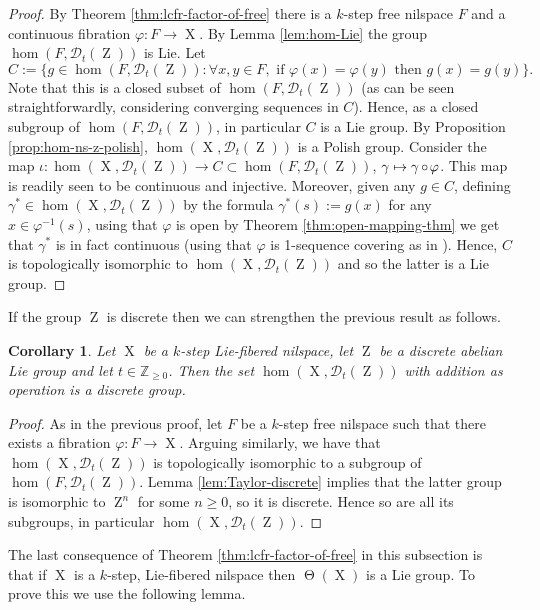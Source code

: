 \documentclass[a4paper,12pt,reqno]{amsart}
\newtheorem{corollary}[theorem]{Corollary}
\theoremstyle{definition}
\def\to{\rightarrow}
\newcommand{\mc}{\mathcal}
\newcommand{\mb}{\mathbb}
\DeclareMathOperator{\ab}{Z}
\DeclareMathOperator{\tran}{\Theta}
\DeclareMathOperator{\ns}{X}
\DeclareMathOperator{\co}{\circ\hspace{-0.02 cm}}
\begin{document}
\begin{proof}
By Theorem \ref{thm:lcfr-factor-of-free} there is a $k$-step free nilspace $F$ and a continuous fibration $\varphi:F\to\ns$. By Lemma \ref{lem:hom-Lie} the group $\hom(F,\mc{D}_t(\ab))$ is Lie. Let 
\[
C:=\{g\in \hom(F,\mc{D}_t(\ab)): \forall x,y\in F, \text{ if } \varphi(x)=\varphi(y) \text{ then } g(x)=g(y)\}.
\]
Note that this is a closed subset of $\hom(F,\mc{D}_t(\ab))$ (as can be seen straightforwardly, considering converging sequences in $C$). Hence, as a closed subgroup of $\hom(F,\mc{D}_t(\ab))$, in particular $C$ is a Lie group. By Proposition \ref{prop:hom-ns-z-polish}, $\hom(\ns,\mc{D}_t(\ab))$ is a Polish group. Consider the map $\iota:\hom(\ns,\mc{D}_t(\ab))\to C\subset \hom(F,\mc{D}_t(\ab))$, $\gamma\mapsto \gamma\co \varphi$. This map is readily seen to be continuous and injective. Moreover, given any $g\in C$, defining  $\gamma^*\in \hom(\ns,\mc{D}_t(\ab))$  by the formula $\gamma^*(s):=g(x)$ for any $x\in \varphi^{-1}(s)$, using that $\varphi$ is open by Theorem \ref{thm:open-mapping-thm} we get that $\gamma^*$ is in fact continuous (using that $\varphi$ is 1-sequence covering as in \cite[\S 4]{Li}). Hence, $C$ is topologically isomorphic to $\hom(\ns,\mc{D}_t(\ab))$ and so the latter is a Lie group.
\end{proof}
If the group $\ab$ is discrete then we can strengthen the previous result as follows.
\begin{corollary}\label{cor:hom-is-discrete}
Let $\ns$ be a $k$-step Lie-fibered nilspace, let $\ab$ be a discrete abelian Lie group and let $t\in \mb{Z}_{\geq 0}$. Then the set $\hom(\ns,\mc{D}_t(\ab))$ with addition as operation is a discrete group.
\end{corollary}

\begin{proof}
As in the previous proof, let $F$ be a $k$-step free nilspace such that there exists a fibration $\varphi:F\to\ns$. Arguing similarly, we have that $\hom(\ns,\mc{D}_t(\ab))$ is topologically isomorphic to a subgroup of $\hom(F,\mc{D}_t(\ab))$. Lemma \ref{lem:Taylor-discrete} implies that the latter group is isomorphic to $\ab^n$ for some $n\ge 0$, so it is discrete. Hence so are all its subgroups, in particular $\hom(\ns,\mc{D}_t(\ab))$.
\end{proof}

\noindent The last consequence of Theorem \ref{thm:lcfr-factor-of-free} in this subsection is that if $\ns$ is a $k$-step, Lie-fibered nilspace then $\tran(\ns)$ is a Lie group. To prove this we use the following lemma.
\end{document}
